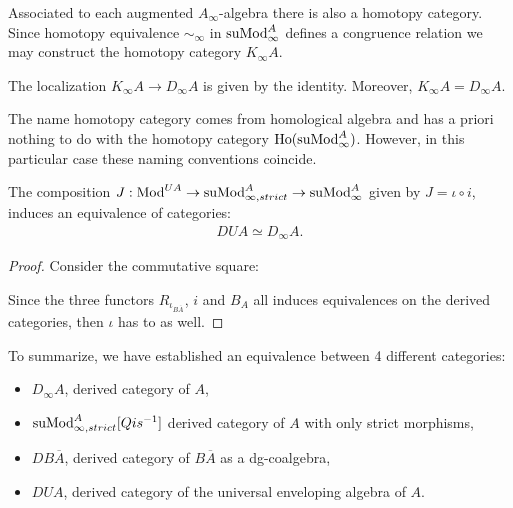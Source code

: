 \documentclass[../thesis.tex]{subfiles}
\begin{document}
            Associated to each augmented $A_\infty$-algebra there is also a homotopy category. Since homotopy equivalence $\sim_\infty$ in $\tt{suMod}_\infty^A$ defines a congruence relation we may construct the homotopy category $K_\infty A$.

            \begin{corollary}
                The localization $K_\infty A \to D_\infty A$ is given by the identity. Moreover, $K_\infty A = D_\infty A$.
            \end{corollary}

            \begin{remark}
                The name homotopy category comes from homological algebra and has a priori nothing to do with the homotopy category $\tt{Ho}(\tt{suMod}_\infty^A)$. However, in this particular case these naming conventions coincide.
            \end{remark}

            \begin{lemma}
                The composition $J : \tt{Mod}^{UA} \to \tt{suMod}_{\infty, strict}^A \to \tt{suMod}_\infty^A$ given by $J = \iota \circ i$, induces an equivalence of categories:
                \begin{align*}
                    DUA \simeq D_\infty A.
                \end{align*}
            \end{lemma}

            \begin{proof}
                Consider the commutative square:
                \begin{center}
                \end{center}

                Since the three functors $R_{\iota_{B\overline{A}}}$, $i$ and $B_A$ all induces equivalences on the derived categories, then $\iota$ has to as well.
            \end{proof}

            To summarize, we have established an equivalence between 4 different categories:
            \begin{itemize}
                \item $D_\infty A$, derived category of $A$,
                \item $\tt{suMod}_{\infty, strict}^A[Qis^{-1}]$ derived category of $A$ with only strict morphisms,
                \item $DB\overline{A}$, derived category of $B\overline{A}$ as a dg-coalgebra,
                \item $DUA$, derived category of the universal enveloping algebra of $A$.
            \end{itemize}
\end{document}
